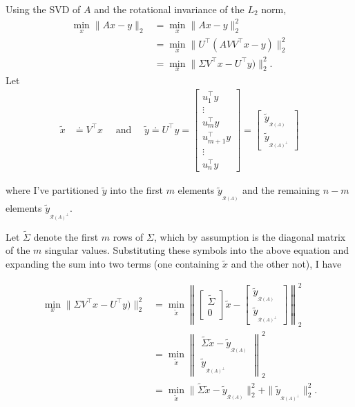 \documentclass[]{article}
\theoremstyle{plain}
\theoremstyle{definition}
\theoremstyle{remark}
\newcommand\norm[1]{\left\lVert#1\right\rVert}
\begin{document}
Using the SVD of $A$ and the rotational invariance of the $L_2$ norm,
\begin{align*}
\min_x \|Ax-y\|_2 &= \min_x \|Ax-y\|_2^2 \\
 &= \min_x \|U^\top(A VV^\top x-y)\|_2^2 \\
 &= \min_x \|\Sigma V^\top x-U^\top y)\|_2^2.
\end{align*}
Let
\begin{align*}
 \tilde{x} &\doteq V^\top x \quad \text{ and } \quad
 \tilde{y} \doteq U^\top y = \begin{bmatrix} u_1^\top y \\ \vdots \\ u_m^\top y  \\ u_{m+1}^\top y \\ \vdots\\ u_n^\top y\end{bmatrix}
  = \begin{bmatrix} \tilde{y}_{_{\mathcal{R}(A)}} \\ \tilde{y}_{_{\mathcal{R}(A)^\perp}} \end{bmatrix}
\end{align*}

where I've partitioned $\tilde{y}$ into the first $m$ elements
$\tilde{y}_{_{\mathcal{R}(A)}}$ and the remaining $n-m$ elements
$\tilde{y}_{_{\mathcal{R}(A)^\perp}}$.

Let $\tilde{\Sigma}$ denote the first $m$ rows of $\Sigma$, which by assumption
is the diagonal matrix of the $m$ singular values.  Substituting these symbols into the
above equation and expanding the sum into two terms (one containing $\tilde{x}$
and the other not), I have

\begin{align*}
\min_x \|\Sigma V^\top x-U^\top y)\|_2^2
  &= \min_{\tilde{x}} \norm{ \begin{bmatrix}\tilde{\Sigma} \\ 0 \end{bmatrix}\tilde{x} - \begin{bmatrix} \tilde{y}_{_{\mathcal{R}(A)}} \\ \tilde{y}_{_{\mathcal{R}(A)^\perp}}  \end{bmatrix}}_2^2 \\
  &= \min_{\tilde{x}} \norm{\begin{matrix} \tilde{\Sigma} \tilde{x} - \tilde{y}_{_{\mathcal{R}(A)}} \\ \tilde{y}_{_{\mathcal{R}(A)^\perp}}\end{matrix}}_2^2  \\
  &= \min_{\tilde{x}} \|\tilde{\Sigma}\tilde{x} -  \tilde{y}_{_{\mathcal{R}(A)}} \|_2^2 + \|\tilde{y}_{_{\mathcal{R}(A)^\perp}}\|_2^2.
\end{align*}
\end{document}
